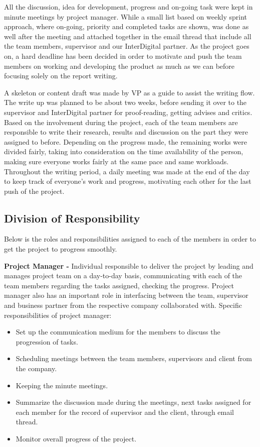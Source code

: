 All the discussion, idea for development, progress and on-going task were kept in minute meetings by project manager. While a small list based on weekly sprint approach, where on-going, priority and completed tasks are shown, was done as well after the meeting and attached together in the email thread that include all the team members, supervisor and our InterDigital partner. As the project goes on, a hard deadline has been decided in order to motivate and push the team members on working and developing the product as much as we can before focusing solely on the report writing. 

A skeleton or content draft was made by VP as a guide to assist the writing flow. The write up was planned to be about two weeks, before sending it over to the supervisor and InterDigital partner for proof-reading, getting advises and critics. Based on the involvement during the project, each of the team members are responsible to write their research, results and discussion on the part they were assigned to before. Depending on the progress made, the remaining works were divided fairly, taking into consideration on the time availability of the person, making sure everyone works fairly at the same pace and same workloads. Throughout the writing period, a daily meeting was made at the end of the day to keep track of everyone’s work and progress, motivating each other for the last push of the project.

\subsection{Division of Responsibility}
Below is the roles and responsibilities assigned to each of the members in order to get the project to progress smoothly. 

\textbf{Project Manager - }
Individual responsible to deliver the project by leading and manages project team on a day-to-day basis, communicating with each of the team members regarding the tasks assigned, checking the progress. Project manager also has an important role in interfacing between the team, supervisor and business partner from the respective company collaborated with. Specific responsibilities of project manager:
\begin{itemize}
    \item Set up the communication medium for the members to discuss the progression of tasks.
    \item Scheduling meetings between the team members, supervisors and client from the company.
    \item Keeping the minute meetings.
    \item Summarize the discussion made during the meetings, next tasks assigned for each member for the record of supervisor and the client, through email thread.
    \item Monitor overall progress of the project.
\end{itemize}

